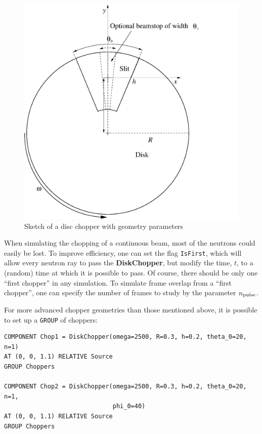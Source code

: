 \begin{figure}[ht]
\centering
\includegraphics[width=0.8\linewidth]{figures/DiskChopper.eps}
\caption{Sketch of a disc chopper with geometry parameters} 
\label{f:chopper1}
\end{figure}


%

When simulating the chopping of a continuous beam,
most of the neutrons could easily be lost.
To improve efficiency, one can set the flag \verb+IsFirst+, which will
allow every neutron ray to pass the {\bf DiskChopper}, but modify the
time, $t$, to a (random) time at which it is possible to pass.
Of course, there should be only one ``first chopper'' in
any simulation.
To simulate frame overlap from a ``first chopper'', one can specify
the number of frames to study by the parameter $n_{\rm pulse}$.

For more advanced chopper geometries than those mentioned above, it is
possible to set up a \texttt{GROUP} of choppers:

\begin{verbatim}
COMPONENT Chop1 = DiskChopper(omega=2500, R=0.3, h=0.2, theta_0=20, n=1)
AT (0, 0, 1.1) RELATIVE Source
GROUP Choppers

COMPONENT Chop2 = DiskChopper(omega=2500, R=0.3, h=0.2, theta_0=20, n=1,
                              phi_0=40)
AT (0, 0, 1.1) RELATIVE Source
GROUP Choppers
\end{verbatim}

